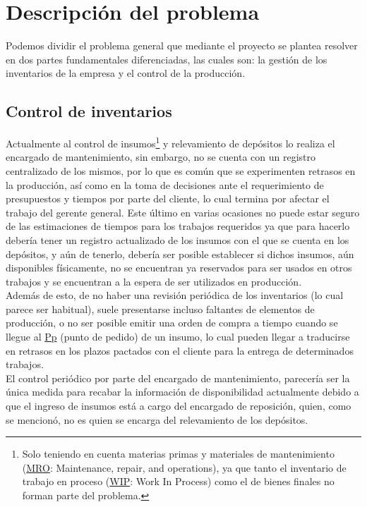 \documentclass[a4paper, 12pt,twoside]{report}  %
\numberwithin{equation}{subsection} %
\begin{document}
\chapter{Descripción del problema} \label{Descripción del problema}

Podemos dividir el problema general que mediante el proyecto se plantea resolver en dos partes fundamentales diferenciadas, las cuales son: la gestión de los inventarios de la empresa y el control de la producción.

\section{Control de inventarios}

Actualmente al control de insumos\renewcommand*{\thefootnote}{\fnsymbol{footnote}}\footnote[1]{Solo teniendo en cuenta materias primas y materiales de mantenimiento (\hyperlink{MRO}{MRO}: Maintenance, repair, and operations), ya que tanto el inventario de trabajo en proceso (\hyperlink{WIP}{WIP}: Work In Process) como el de bienes finales no forman parte del problema.}\renewcommand*{\thefootnote}{\arabic{footnote}} y relevamiento de depósitos lo realiza el encargado de mantenimiento, sin embargo, no se cuenta con un registro centralizado de los mismos, por lo que es común que se experimenten retrasos en la producción, así como en la toma de decisiones ante el requerimiento de presupuestos y tiempos por parte del cliente, lo cual termina por afectar el trabajo del gerente general. Este último en varias ocasiones no puede estar seguro de las estimaciones de tiempos para los trabajos requeridos ya que para hacerlo debería tener un registro actualizado de los insumos con el que se cuenta en los depósitos, y aún de tenerlo, debería ser posible establecer si dichos insumos, aún disponibles físicamente, no se encuentran ya reservados para ser usados en otros trabajos y se encuentran a la espera de ser utilizados en producción.\\
\indent Además de esto, de no haber una revisión periódica de los inventarios (lo cual parece ser habitual), suele presentarse incluso faltantes de elementos de producción, o no ser posible emitir una orden de compra a tiempo cuando se llegue al \hyperlink{Pp}{Pp} (punto de pedido) de un insumo, lo cual pueden llegar a traducirse en retrasos en los plazos pactados con el cliente para la entrega de determinados trabajos.\\
\indent El control periódico por parte del encargado de mantenimiento, parecería ser la única medida para recabar la información de disponibilidad actualmente debido a que el ingreso de insumos está a cargo del encargado de reposición, quien, como se mencionó, no es quien se encarga del relevamiento de los depósitos.
\end{document}
